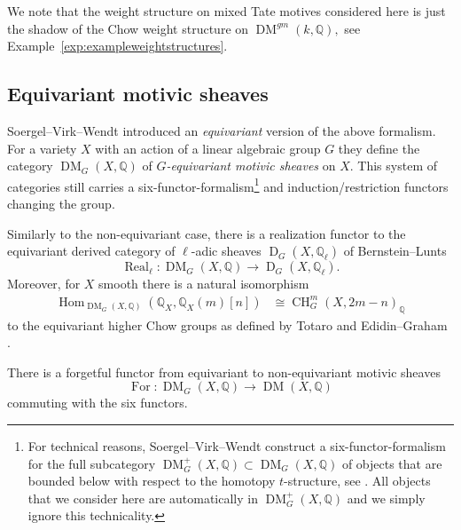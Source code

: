 \documentclass{amsart}
\theoremstyle{plain}
\theoremstyle{TheoremNum}
\theoremstyle{definition}
\theoremstyle{remark}
\numberwithin{equation}{section}
\newcommand{\Q}{\mathbb{Q}}
\newcommand{\un}{\Q}
\newcommand{\Chow}{\operatorname{CH}}
\newcommand{\DM}{\operatorname{DM}}
\newcommand{\Hom}{\operatorname{Hom}}
\newcommand{\For}{\operatorname{For}}
\newcommand{\Dladic}{\operatorname{D}}
\newcommand{\Real}{\operatorname{Real}}
\begin{document}
We note that the weight structure on mixed Tate motives considered here is just the shadow of the Chow weight structure on $\DM^{gm}(k,\Q),$ see Example~\ref{exp:exampleweightstructures}.

\subsection{Equivariant motivic sheaves}\label{sec:equivariantmotives}
Soergel--Virk--Wendt \cite{soergel_equivariant_2018} introduced an \emph{equivariant} version of the above formalism.
For a variety $X$ with an action of a linear algebraic group $G$
they define the category $\DM_G(X,\Q)$ of \emph{$G$-equivariant motivic sheaves} on $X.$ This system of categories still carries a six-functor-formalism\footnote{For technical reasons, Soergel--Virk--Wendt construct a six-functor-formalism for the full subcategory $\DM^+_G(X,\Q)\subset \DM_G(X,\Q)$ of objects that are bounded below with respect to the homotopy $t$-structure, see \cite[Section I.6]{soergel_equivariant_2018}. All objects that we consider here are automatically in  $\DM^+_G(X,\Q)$ and we simply ignore this technicality.}  and induction/restriction functors changing the group.

Similarly to the non-equivariant case, there is a realization functor
to the equivariant derived category of $\ell$-adic sheaves  $\Dladic_G(X,\Q_\ell)$ of Bernstein--Lunts \cite{bernstein_equivariant_1994}
$$\Real_\ell: \DM_G(X,\Q)\to \Dladic_G(X,\Q_\ell).$$
Moreover, for $X$ smooth there is a natural isomorphism
\begin{align}
    \Hom_{\DM_G(X,\Q)}(\un_X,\un_X(m)[n])&
    \cong\Chow^m_G(X,2m-n)_\Q\label{eqn:equivariantmotiviccomologychowgroups}
\end{align}
to the equivariant higher Chow groups as defined by Totaro \cite{raskind_chow_1999} and Edidin--Graham \cite{edidin_equivariant_1998}.

There is a forgetful functor from equivariant to non-equivariant motivic sheaves
$$\For: \DM_G(X,\Q)\to \DM(X,\Q)$$
commuting with the six functors.
\end{document}

